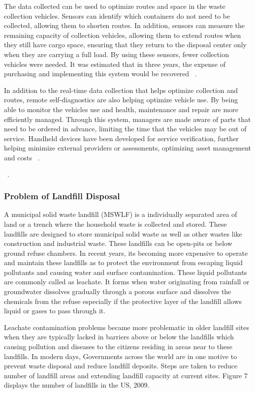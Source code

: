\documentclass[sigconf]{acmart}
\begin{document}
The data collected can be used to optimize routes and space in the waste collection vehicles.  Sensors can identify which containers do not need to be collected, allowing them to shorten routes.  In addition, sensors can measure the remaining capacity of collection vehicles, allowing them to extend routes when they still have cargo space, ensuring that they return to the disposal center only when they are carrying a full load.  By using these sensors, fewer collection vehicles were needed.  It was estimated that in three years, the expense of purchasing and implementing this system would be recovered  ~\cite{shahrokni2014big}.

In addition to the real-time data collection that helps optimize collection and routes, remote self-diagnostics are also helping optimize vehicle use.  By being able to monitor the vehicles use and health, maintenance and repair are more efficiently managed.  Through this system, managers are made aware of parts that need to be ordered in advance, limiting the time that the vehicles may be out of service.  Handheld devices have been developed for service verification, further helping minimize external providers or assessments, optimizing asset management and costs ~\cite{megan2017}.


~\cite{shahrokni2014big}.

\subsubsection{Problem of Landfill Disposal}

A municipal solid waste landfill (MSWLF) is a individually separated area of land or a trench where the household waste is collected and stored. These landfills are designed to store municipal solid waste as well as other wastes like construction and industrial waste. These landfills can be open-pits or below ground refuse chambers. In recent years, its becoming more expensive to operate and maintain these landfills as to protect the environment from escaping liquid pollutants and causing water and surface contamination. These liquid pollutants are commonly called as leachate. It forms when water originating from rainfall or groundwater dissolves gradually through a porous surface and dissolves the chemicals from the refuse especially if the protective layer of the landfill allows liquid or gases to pass through it. 

Leachate contamination problems became more problematic in older landfill sites when they are typically lacked in barriers above or below the landfills which causing pollution and diseases to the citizens residing in areas near to these landfills. In modern days, Governments across the world are in one motive to prevent waste disposal and reduce landfill deposits. Steps are taken to reduce number of landfill areas and extending landfill capacity at current sites. Figure 7 displays the number of landfills in the US, 2009.
\end{document}
